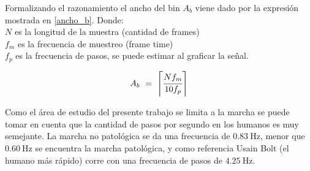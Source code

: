 Formalizando el razonamiento el ancho del bin $A_b$ viene dado por la expresión mostrada en \eqref{ancho_b}. Donde:\\
$N$ es la longitud de la muestra (cantidad de frames) \\
$f_m$ es la frecuencia de muestreo (frame time) \\
$f_p$ es la frecuencia de pasos, se puede estimar al graficar la señal. 

\begin{equation}\label{ancho_b}
    A_b\ =\ \left\lceil \cfrac{N f_m}{10 f_p} \right\rceil
\end{equation}

Como el área de estudio del presente trabajo se limita a la marcha se puede tomar en cuenta que la cantidad de pasos por segundo en los humanos es muy semejante. La marcha no patológica se da una frecuencia de $0.83\ \text{Hz}$, menor que $0.60\ \text{Hz}$ se encuentra la marcha patológica, y como referencia Usain Bolt (el humano más rápido) corre con una frecuencia de pasos de $4.25\ \text{Hz}$. \citep{perry, huntley}
